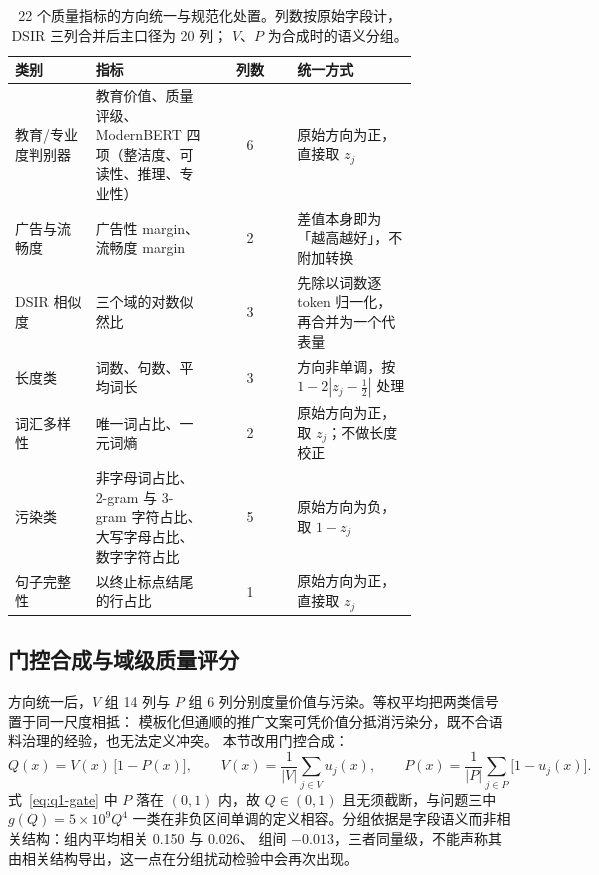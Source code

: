 \begin{table}[H]
  \centering
  \caption{22 个质量指标的方向统一与规范化处置。列数按原始字段计，DSIR 三列合并后主口径为 20 列；
  $V$、$P$ 为合成时的语义分组。}
  \label{tab:q1-direction}
  \begin{tabular}{@{}p{0.20\linewidth}p{0.30\linewidth}cp{0.30\linewidth}@{}}
    \toprule
    类别 & 指标 & 列数 & 统一方式 \\
    \midrule
    教育/专业度判别器 & 教育价值、质量评级、ModernBERT 四项（整洁度、可读性、推理、专业性）
      & 6 & 原始方向为正，直接取 $z_j$ \\
    广告与流畅度 & 广告性 margin、流畅度 margin & 2 & 差值本身即为「越高越好」，不附加转换 \\
    DSIR 相似度 & 三个域的对数似然比 & 3 & 先除以词数逐 token 归一化，再合并为一个代表量 \\
    长度类 & 词数、句数、平均词长 & 3 & 方向非单调，按 $1-2|z_j-\frac12|$ 处理 \\
    词汇多样性 & 唯一词占比、一元词熵 & 2 & 原始方向为正，取 $z_j$；不做长度校正 \\
    污染类 & 非字母词占比、2-gram 与 3-gram 字符占比、大写字母占比、数字字符占比
      & 5 & 原始方向为负，取 $1-z_j$ \\
    句子完整性 & 以终止标点结尾的行占比 & 1 & 原始方向为正，直接取 $z_j$ \\
    \bottomrule
  \end{tabular}
\end{table}

\subsection{门控合成与域级质量评分}
\label{subsec:q1-domain}

方向统一后，$V$ 组 14 列与 $P$ 组 6 列分别度量价值与污染。等权平均把两类信号置于同一尺度相抵：
模板化但通顺的推广文案可凭价值分抵消污染分，既不合语料治理的经验，也无法定义冲突。
本节改用门控合成：
\begin{equation}
  Q(x)=V(x)\,\bigl[1-P(x)\bigr],\qquad
  V(x)=\frac{1}{|V|}\sum_{j\in V}u_j(x),\qquad
  P(x)=\frac{1}{|P|}\sum_{j\in P}\bigl[1-u_j(x)\bigr].
  \label{eq:q1-gate}
\end{equation}
式~\eqref{eq:q1-gate} 中 $P$ 落在 $(0,1)$ 内，故 $Q\in(0,1)$ 且无须截断，与问题三中 $g(Q)=5\times10^{9}Q^{4}$
一类在非负区间单调的定义相容。分组依据是字段语义而非相关结构：组内平均相关 0.150 与 0.026、
组间 $-0.013$，三者同量级，不能声称其由相关结构导出，这一点在分组扰动检验中会再次出现。

